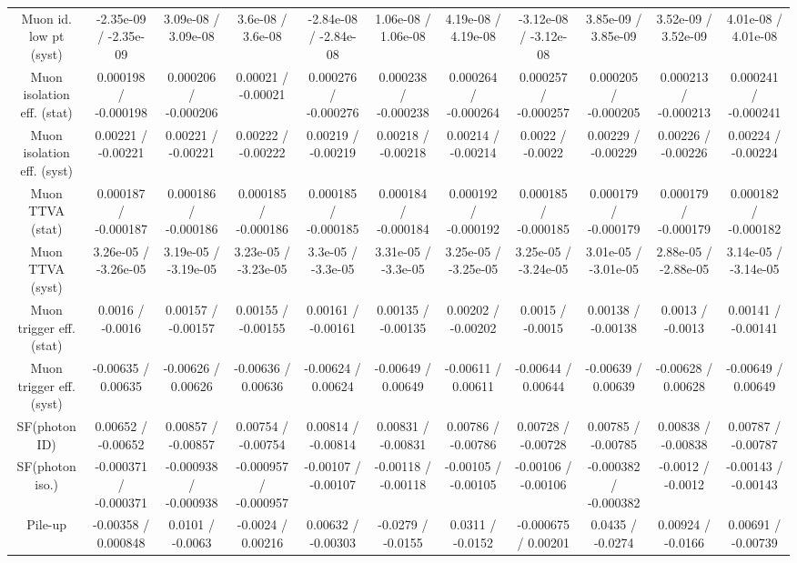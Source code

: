 \begin{table}[htbp]
\begin{center}
\begin{tabular}{|c|c|c|c|c|c|c|c|c|c|c|}
  Muon id. low pt (syst) & -2.35e-09 / -2.35e-09 & 3.09e-08 / 3.09e-08 & 3.6e-08 / 3.6e-08 & -2.84e-08 / -2.84e-08 & 1.06e-08 / 1.06e-08 & 4.19e-08 / 4.19e-08 & -3.12e-08 / -3.12e-08 & 3.85e-09 / 3.85e-09 & 3.52e-09 / 3.52e-09 & 4.01e-08 / 4.01e-08 \\ 
  Muon isolation eff. (stat) & 0.000198 / -0.000198 & 0.000206 / -0.000206 & 0.00021 / -0.00021 & 0.000276 / -0.000276 & 0.000238 / -0.000238 & 0.000264 / -0.000264 & 0.000257 / -0.000257 & 0.000205 / -0.000205 & 0.000213 / -0.000213 & 0.000241 / -0.000241 \\ 
  Muon isolation eff. (syst) & 0.00221 / -0.00221 & 0.00221 / -0.00221 & 0.00222 / -0.00222 & 0.00219 / -0.00219 & 0.00218 / -0.00218 & 0.00214 / -0.00214 & 0.0022 / -0.0022 & 0.00229 / -0.00229 & 0.00226 / -0.00226 & 0.00224 / -0.00224 \\ 
  Muon TTVA (stat) & 0.000187 / -0.000187 & 0.000186 / -0.000186 & 0.000185 / -0.000186 & 0.000185 / -0.000185 & 0.000184 / -0.000184 & 0.000192 / -0.000192 & 0.000185 / -0.000185 & 0.000179 / -0.000179 & 0.000179 / -0.000179 & 0.000182 / -0.000182 \\ 
  Muon TTVA (syst) & 3.26e-05 / -3.26e-05 & 3.19e-05 / -3.19e-05 & 3.23e-05 / -3.23e-05 & 3.3e-05 / -3.3e-05 & 3.31e-05 / -3.3e-05 & 3.25e-05 / -3.25e-05 & 3.25e-05 / -3.24e-05 & 3.01e-05 / -3.01e-05 & 2.88e-05 / -2.88e-05 & 3.14e-05 / -3.14e-05 \\ 
  Muon trigger eff. (stat) & 0.0016 / -0.0016 & 0.00157 / -0.00157 & 0.00155 / -0.00155 & 0.00161 / -0.00161 & 0.00135 / -0.00135 & 0.00202 / -0.00202 & 0.0015 / -0.0015 & 0.00138 / -0.00138 & 0.0013 / -0.0013 & 0.00141 / -0.00141 \\ 
  Muon trigger eff. (syst) & -0.00635 / 0.00635 & -0.00626 / 0.00626 & -0.00636 / 0.00636 & -0.00624 / 0.00624 & -0.00649 / 0.00649 & -0.00611 / 0.00611 & -0.00644 / 0.00644 & -0.00639 / 0.00639 & -0.00628 / 0.00628 & -0.00649 / 0.00649 \\ 
  SF(photon ID) & 0.00652 / -0.00652 & 0.00857 / -0.00857 & 0.00754 / -0.00754 & 0.00814 / -0.00814 & 0.00831 / -0.00831 & 0.00786 / -0.00786 & 0.00728 / -0.00728 & 0.00785 / -0.00785 & 0.00838 / -0.00838 & 0.00787 / -0.00787 \\ 
  SF(photon iso.) & -0.000371 / -0.000371 & -0.000938 / -0.000938 & -0.000957 / -0.000957 & -0.00107 / -0.00107 & -0.00118 / -0.00118 & -0.00105 / -0.00105 & -0.00106 / -0.00106 & -0.000382 / -0.000382 & -0.0012 / -0.0012 & -0.00143 / -0.00143 \\ 
  Pile-up & -0.00358 / 0.000848 & 0.0101 / -0.0063 & -0.0024 / 0.00216 & 0.00632 / -0.00303 & -0.0279 / -0.0155 & 0.0311 / -0.0152 & -0.000675 / 0.00201 & 0.0435 / -0.0274 & 0.00924 / -0.0166 & 0.00691 / -0.00739 \\ 

\end{tabular}
\end{center}
\end{table}
